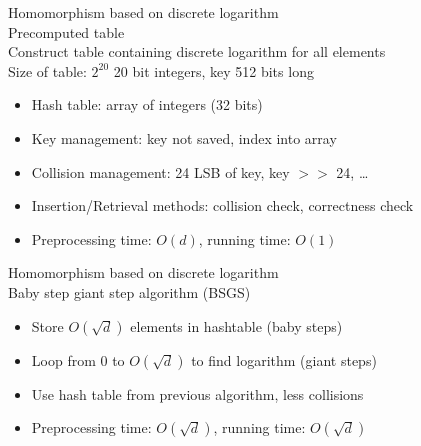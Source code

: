 \documentclass[a4, landscape, slidesonly]{seminar}
\renewcommand{\emph}[1]{{\color{emphcolor} #1}}
\newcommand{\slidetitle}[1]{{\large \color{titlecolor} #1}}
\begin{document}
\begin{slide}
\slidetitle{Homomorphism based on discrete logarithm}
\\[0.8cm]
\emph{Precomputed table}\\
Construct table containing discrete logarithm for all elements\\
Size of table: $2^{20}$ 20 bit integers, key 512 bits long 
\begin{itemize}
\item Hash table: array of integers (32 bits)
\item Key management: key not saved, index into array
\item Collision management: 24 LSB of key, key $>$$>$ 24, \ldots
\item Insertion/Retrieval methods: collision check, correctness check
\item Preprocessing time: $O(d)$, running time: $O(1)$
\end{itemize} 
\end{slide}
\begin{slide}
\slidetitle{Homomorphism based on discrete logarithm}
\\[0.8cm]
\emph{Baby step giant step algorithm (BSGS)}
\begin{itemize}
\item Store $O(\sqrt d)$  elements in hashtable (baby steps)
\item Loop from 0 to $O(\sqrt d)$ to find logarithm (giant steps)
\item Use hash table from previous algorithm, less collisions
\item Preprocessing time: $O(\sqrt d)$, running time: $O(\sqrt d)$
\end{itemize}
\begin{comment}
Compute $x = \log_g(y)$\begin{itemize}
\item[] Set $m \gets \lceil \sqrt d \rceil$ 
\item[] Construct a hash table with entries $(g^j,j)$ for $0 \le j \le m$ 
\item[] FOR $i$ from $0$ to $m-1$ DO 
	\begin{itemize} 
 	\item[] Check if there is an entry $j$ for $y$ in hash table
 	\item[] IF $(\gamma = g^j)$ return $x \gets im + j$ 
 	\item[] Set $y \gets y ^{-m}$
 	\end{itemize}
\item[] END FOR
\end{itemize}
\end{comment}
\end{slide}
\end{document}
